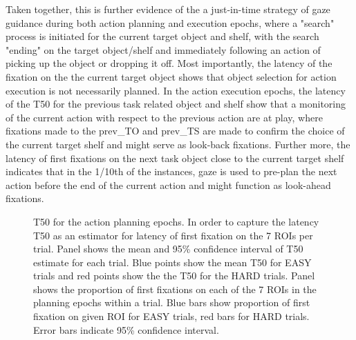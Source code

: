 Taken together, this is further evidence of the a just-in-time strategy of gaze guidance during both action planning and execution epochs, where a "search" process is initiated for the current target object and shelf, with the search "ending" on the target object/shelf and immediately following an action of picking up the object or dropping it off. Most importantly, the latency of the fixation on the the current target object shows that object selection for action execution is not necessarily planned. In the action execution epochs, the latency of the T50 for the previous task related object and shelf show that a monitoring of the current action with respect to the previous action are at play, where fixations made to the prev\_TO and prev\_TS are made to confirm the choice of the current target shelf and might serve as look-back fixations. Further more, the latency of first fixations on the next task object close to the current target shelf indicates that in the 1/10th of the instances, gaze is used to pre-plan the next action before the end of the current action and might function as look-ahead fixations.

\begin{figure}[h]
    \centering
    \caption[]{T50 for the action planning epochs. In order to capture the latency T50 as an estimator for latency of first fixation on the 7 ROIs per trial.
    Panel \protect{} shows the mean and 95\% confidence interval of T50 estimate for each trial. Blue points show the mean T50 for EASY trials and red points show the the T50 for the HARD trials.
    Panel \protect{} shows the proportion of first fixations on each of the 7 ROIs in the planning epochs within a trial. Blue bars show proportion of first fixation on given ROI for EASY trials, red bars for HARD trials. Error bars indicate 95\% confidence interval. }
     \label{figure:t50_subject_plan}
\end{figure}

